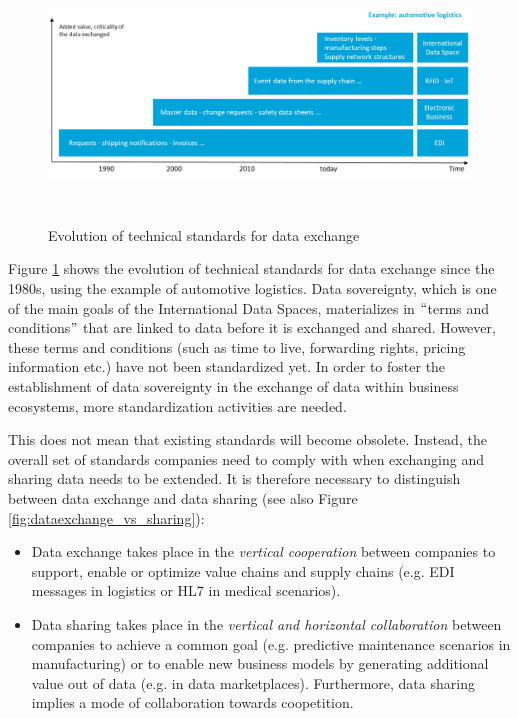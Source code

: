 \begin{figure}[h]
	\begin{Center}
		\includegraphics[width=6.67in,height=2.68in]{./media/image13.png}
		\caption{Evolution of technical standards for data exchange}
		\label{fig:Datadriven_business_ecosystems}
	\end{Center}
\end{figure}




Figure \ref{fig:Datadriven_business_ecosystems} shows the evolution of technical standards for data exchange since the 1980s, using the example of automotive logistics. Data sovereignty, which is one of the main goals of the International Data Spaces, materializes in $``$terms and conditions$"$  that are linked to data before it is exchanged and shared. However, these terms and conditions (such as time to live, forwarding rights, pricing information etc.) have not been standardized yet. In order to foster the establishment of data sovereignty in the exchange of data within business ecosystems, more standardization activities are needed.

This does not mean that existing standards will become obsolete. Instead, the overall set of standards companies need to comply with when exchanging and sharing data needs to be extended. It is therefore necessary to distinguish between data exchange and data sharing (see also Figure \ref{fig:dataexchange_vs_sharing}): 

\begin{itemize}
	\item Data exchange takes place in the \textit{vertical cooperation} between companies to support, enable or optimize value chains and supply chains (e.g. EDI messages in logistics or HL7 in medical scenarios).

	\item Data sharing takes place in the \textit{vertical and horizontal collaboration} between companies to achieve a common goal (e.g. predictive maintenance scenarios in manufacturing) or to enable new business models by generating additional value out of data (e.g. in data marketplaces). Furthermore, data sharing implies a mode of collaboration towards coopetition.

\end{itemize}



